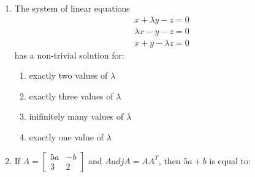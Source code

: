 \documentclass[journal,12pt,twocolumn]{IEEEtran}
\theoremstyle{remark}
\begin{document}
\begin{enumerate}
\begin{enumerate}[label={(\alph*)}]
	\end{enumerate}


	\item The system of linear equations 
	\begin{align*}
		x+\lambda y-z=0\\
		\lambda x-y-z=0\\
		x+y-\lambda z=0
	\end{align*}
	has a non-trivial solution for:

	\hfill{}
	\begin{enumerate}[label={(\alph*)}]
		\item exactly two values of $\lambda$ 
		\item exactly three values of $\lambda$ 
		\item inifinitely many values of $\lambda$
		\item exactly one value of $\lambda$ 
	\end{enumerate}


	\item If $A = \begin{bmatrix}5a&-b\\3&2\end{bmatrix}$ and $A adj A = AA^{T}$, then $5a + b$ is equal to: 
	\hfill{}
	\begin{enumerate}[label={(\alph*)}]

	\end{enumerate}


\end{enumerate}
\end{document}
